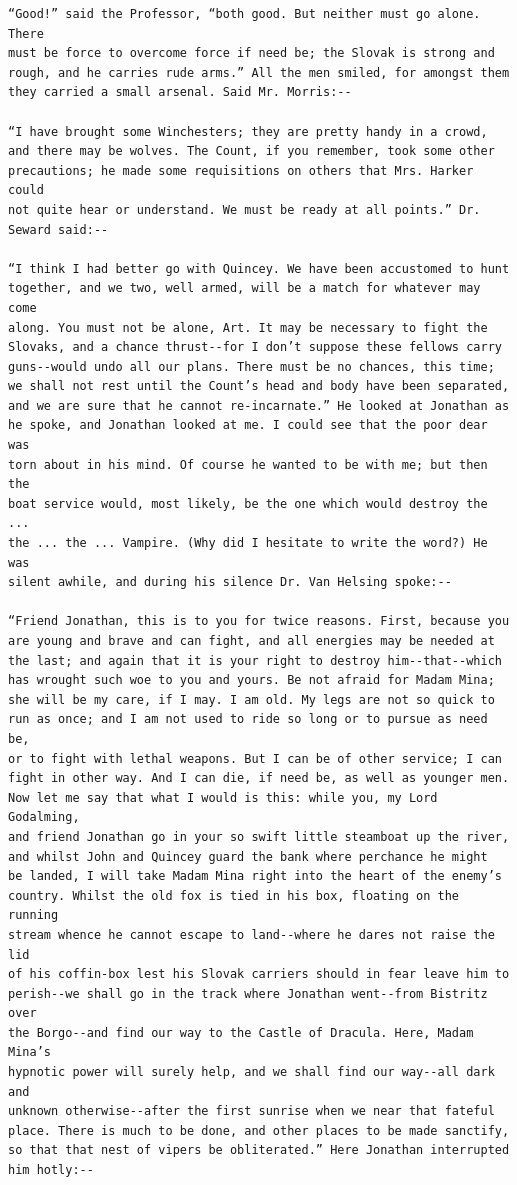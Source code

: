 \documentclass{article}
\begin{document}
\begin{verbatim}
“Good!” said the Professor, “both good. But neither must go alone. There
must be force to overcome force if need be; the Slovak is strong and
rough, and he carries rude arms.” All the men smiled, for amongst them
they carried a small arsenal. Said Mr. Morris:--

“I have brought some Winchesters; they are pretty handy in a crowd,
and there may be wolves. The Count, if you remember, took some other
precautions; he made some requisitions on others that Mrs. Harker could
not quite hear or understand. We must be ready at all points.” Dr.
Seward said:--

“I think I had better go with Quincey. We have been accustomed to hunt
together, and we two, well armed, will be a match for whatever may come
along. You must not be alone, Art. It may be necessary to fight the
Slovaks, and a chance thrust--for I don’t suppose these fellows carry
guns--would undo all our plans. There must be no chances, this time;
we shall not rest until the Count’s head and body have been separated,
and we are sure that he cannot re-incarnate.” He looked at Jonathan as
he spoke, and Jonathan looked at me. I could see that the poor dear was
torn about in his mind. Of course he wanted to be with me; but then the
boat service would, most likely, be the one which would destroy the ...
the ... the ... Vampire. (Why did I hesitate to write the word?) He was
silent awhile, and during his silence Dr. Van Helsing spoke:--

“Friend Jonathan, this is to you for twice reasons. First, because you
are young and brave and can fight, and all energies may be needed at
the last; and again that it is your right to destroy him--that--which
has wrought such woe to you and yours. Be not afraid for Madam Mina;
she will be my care, if I may. I am old. My legs are not so quick to
run as once; and I am not used to ride so long or to pursue as need be,
or to fight with lethal weapons. But I can be of other service; I can
fight in other way. And I can die, if need be, as well as younger men.
Now let me say that what I would is this: while you, my Lord Godalming,
and friend Jonathan go in your so swift little steamboat up the river,
and whilst John and Quincey guard the bank where perchance he might
be landed, I will take Madam Mina right into the heart of the enemy’s
country. Whilst the old fox is tied in his box, floating on the running
stream whence he cannot escape to land--where he dares not raise the lid
of his coffin-box lest his Slovak carriers should in fear leave him to
perish--we shall go in the track where Jonathan went--from Bistritz over
the Borgo--and find our way to the Castle of Dracula. Here, Madam Mina’s
hypnotic power will surely help, and we shall find our way--all dark and
unknown otherwise--after the first sunrise when we near that fateful
place. There is much to be done, and other places to be made sanctify,
so that that nest of vipers be obliterated.” Here Jonathan interrupted
him hotly:--


\end{verbatim}
\end{document}
